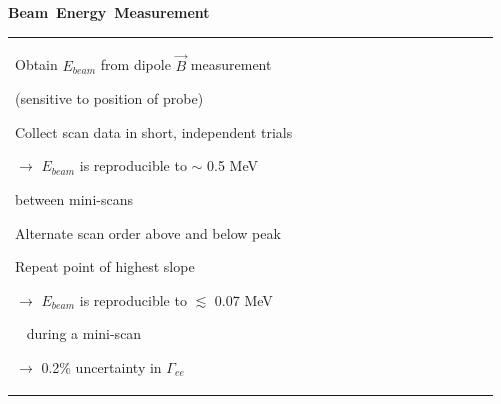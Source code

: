 \documentclass[landscape]{article}
\newenvironment{slide}[1][ ]{\mbox{\bf #1 } \vfill}{\vfill \mbox{ } \pagebreak}
\begin{document}
\begin{slide}[Beam Energy Measurement]

\begin{tabular}{p{0.6\linewidth} p{0.38\linewidth}}
  \begin{minipage}{\linewidth}
    \begin{minipage}{0.9\linewidth}

      Obtain $E_{beam}$ from dipole $\vec{B}$ measurement

      \vspace{0.5 cm}
      \hspace{1 cm} (sensitive to position of probe)

      \vspace{1.5 cm}
      Collect scan data in short, independent trials

      \vspace{0.5 cm}
      \hspace{1 cm} $\rightarrow$ $E_{beam}$ is reproducible to $\sim$ 0.5 MeV

      \hfill between mini-scans

      \vspace{1.5 cm}
      Alternate scan order above and below peak

      \vspace{1.5 cm}
      Repeat point of highest slope

      \vspace{0.5 cm}
      \hspace{1 cm} $\rightarrow$ $E_{beam}$ is reproducible to $\lesssim$ 0.07 MeV

      \mbox{ } \hfill during a mini-scan

      \vspace{0.2 cm}
      \hspace{1 cm} $\rightarrow$ 0.2\% uncertainty in $\Gamma_{ee}$

    \end{minipage}


\end{minipage}
\end{tabular}
\end{slide}
\end{document}
